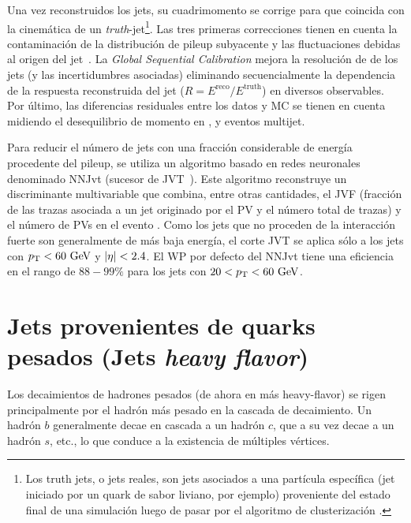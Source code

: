 Una vez reconstruidos los jets, su cuadrimomento se corrige para que coincida con la cinemática de un \textit{truth}-jet\footnote{Los truth jets, o jets reales, son jets asociados a una partícula específica (jet iniciado por un quark de sabor liviano, por ejemplo) proveniente del estado final de una simulación luego de pasar por el algoritmo de clusterización \antikt.}. Las tres primeras correcciones tienen en cuenta la contaminación de la distribución de pileup subyacente y las fluctuaciones debidas al origen del jet~\cite{ATLAS-Jet-Calibration-Run2}. La \textit{Global Sequential Calibration} mejora la resolución de \pt de los jets (y las incertidumbres asociadas) eliminando secuencialmente la dependencia de la respuesta reconstruida del jet (\(R= E^{\text{reco}} / E^{\text{truth}}\)) en diversos observables. Por último, las diferencias residuales entre los datos y \ac{MC} se tienen en cuenta midiendo el desequilibrio de momento en \Zjets, \gammajet y eventos multijet.

Para reducir el número de jets con una fracción considerable de energía procedente del pileup, se utiliza un algoritmo basado en redes neuronales denominado \ac{NNJvt} (sucesor de \ac{JVT}~\cite{ATLAS-JetPileup-Run1}). Este algoritmo reconstruye un discriminante multivariable que combina, entre otras cantidades, el \ac{JVF} (fracción de las trazas \pt asociada a un jet originado por el \ac{PV} y el número total de trazas) y el número de \acp{PV} en el evento \Npv. Como los jets que no proceden de la interacción fuerte son generalmente de más baja energía, el corte \ac{JVT} se aplica sólo a los jets con \(p_{\text{T}}<60~\text{GeV}\) y \(|\eta|<2.4\). El \ac{WP} por defecto del \ac{NNJvt} tiene una eficiencia en el rango de \(88-99\%\) para los jets con \(20<p_{\text{T}}<60~\text{GeV}\).


















\section{Jets provenientes de quarks pesados (Jets \textit{heavy flavor})}
\label{sec:objects:ftag}

Los decaimientos de hadrones pesados (de ahora en más heavy-flavor) se rigen principalmente por el hadrón más pesado en la cascada de decaimiento. Un hadrón \(b\) generalmente decae en cascada a un hadrón \(c\), que a su vez decae a un hadrón \(s\), etc., lo que conduce a la existencia de múltiples vértices.

